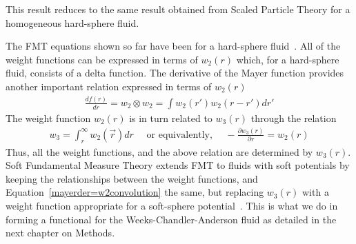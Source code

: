 \documentclass[double,12pt]{beavtex}
\begin{document}
This result reduces to the same result obtained from Scaled Particle Theory 
for a homogeneous hard-sphere fluid.

The FMT equations shown so far have been for a hard-sphere fluid~\cite{Hansen}.
All of the weight functions can be expressed in terms of 
$w_{2}(r)$ which, for a hard-sphere fluid, consists of a delta function.
The derivative of the Mayer function provides 
another important relation expressed in terms of $w_{2}(r)$ 
\begin{align}\label{mayerder=w2convolution}
     \frac{df(r)}{dr} = w_2 \otimes w_2 = \int{w_2(r')w_2(r-r')dr'}
\end{align} 
The weight function $w_{2}(r)$ is in turn related to $w_{3}(r)$ through 
the relation
\begin{align}\label{w2_w3_relation}
    w_{3}=\int_{r}^{\infty}{w_{2}(\vec{r})dr}\mbox{~~~~or equivalently,~~~~}-\frac{\partial{w_3(r)}}{\partial{r}}=w_2(r)
\end{align}
Thus, all the weight functions, and the above relation are determined
by $w_{3}(r)$.
Soft Fundamental Measure Theory extends FMT to fluids 
with soft potentials by keeping the relationships between the weight 
functions, and Equation~\ref{mayerder=w2convolution} 
the same, but replacing $w_{3}(r)$ with a weight function appropriate 
for a soft-sphere potential~\cite{schmidt1999density, schmidt2000fluid}. 
This is what we do in forming a functional for the Weeks-Chandler-Anderson 
fluid as detailed in the next chapter on Methods.
\end{document}
